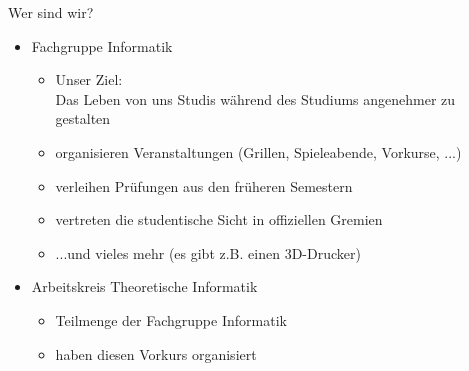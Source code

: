 %
%
%
%

\begin{frame}[fragile]{Wer sind wir?}
  \begin{itemize}
    \item
          Fachgruppe Informatik
          \begin{itemize}
            \item Unser Ziel: \\
                  Das Leben von uns Studis während des Studiums angenehmer zu gestalten
            \item organisieren Veranstaltungen (Grillen, Spieleabende, Vorkurse, ...)
            \item verleihen Prüfungen aus den früheren Semestern
            \item vertreten die studentische Sicht in offiziellen Gremien
            \item ...und vieles mehr (es gibt z.B. einen 3D-Drucker)
          \end{itemize}
    \item Arbeitskreis Theoretische Informatik
          \begin{itemize}
            \item Teilmenge der Fachgruppe Informatik
            \item haben diesen Vorkurs organisiert
          \end{itemize}
  \end{itemize}
\end{frame}

